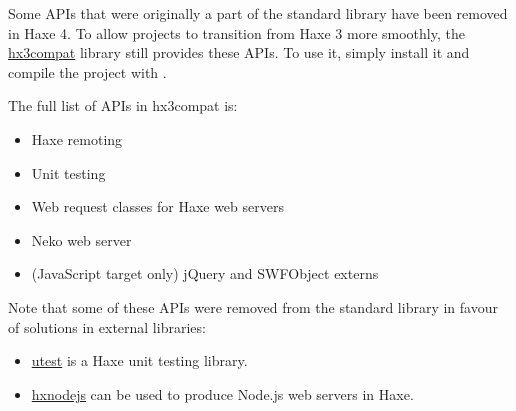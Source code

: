 Some APIs that were originally a part of the standard library have been removed in Haxe 4. To allow projects to transition from Haxe 3 more smoothly, the \href{https://github.com/HaxeFoundation/hx3compat/}{hx3compat} library still provides these APIs. To use it, simply install it and compile the project with .

The full list of APIs in hx3compat is:

\begin{itemize}
	\item {} Haxe remoting
	\item {} Unit testing
	\item {} Web request classes for Haxe web servers
	\item {} Neko web server
	\item (JavaScript target only) jQuery and SWFObject externs
\end{itemize}

Note that some of these APIs were removed from the standard library in favour of solutions in external libraries:

\begin{itemize}
	\item \href{https://github.com/haxe-utest/utest}{utest} is a Haxe unit testing library.
	\item \href{https://github.com/HaxeFoundation/hxnodejs}{hxnodejs} can be used to produce Node.js web servers in Haxe.
\end{itemize}
